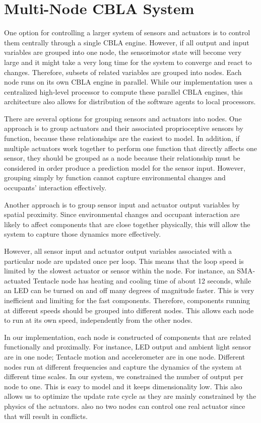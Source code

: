 \section{Multi-Node CBLA System}

One option for controlling a larger system of sensors and actuators is to control them centrally through a single CBLA engine.  However, if all output and input variables are grouped into one node, the sensorimotor state will become very large and it might take a very long time for the system to converge and react to changes. Therefore, subsets of related variables are grouped into nodes. Each node runs on its own CBLA engine in parallel.  While our implementation uses a centralized high-level processor to compute these parallel CBLA engines, this architecture also allows for distribution of the software agents to local processors.

There are several options for grouping sensors and actuators into nodes.  One approach is to group actuators and their associated proprioceptive sensors by function, because these relationships are the easiest to model. In addition, if multiple actuators work together to perform one function that directly affects one sensor, they should be grouped as a node because their relationship must be considered in order produce a prediction model for the sensor input. However, grouping simply by function cannot capture environmental changes and occupants' interaction effectively.

Another approach is to group sensor input and actuator output variables by spatial proximity. Since environmental changes and occupant interaction are likely to affect components that are close together physically, this will allow the system to capture those dynamics more effectively. 

However, all sensor input and actuator output variables associated with a particular node are updated once per loop. This means that the loop speed is limited by the slowest actuator or sensor within the node. For instance, an SMA-actuated Tentacle node has heating and cooling time of about 12 seconds, while an LED can be turned on and off many degrees of magnitude faster. This is very inefficient and limiting for the fast components. Therefore, components running at different speeds should be grouped into different nodes. This allows each node to run at its own speed, independently from the other nodes. 

In our implementation, each node is constructed of components that are related functionally and proximally. For instance, LED output and ambient light sensor are in one node; Tentacle motion and accelerometer are in one node. 
Different nodes run at different frequencies and capture the dynamics of the system at different time scales. 
In our system, we constrained the number of output per node to one. This is easy to model and it keeps dimensionality low. This also allows us to optimize the update rate cycle as they are mainly constrained by the physics of the actuators. also no two nodes can control one real actuator since that will result in conflicts. 

